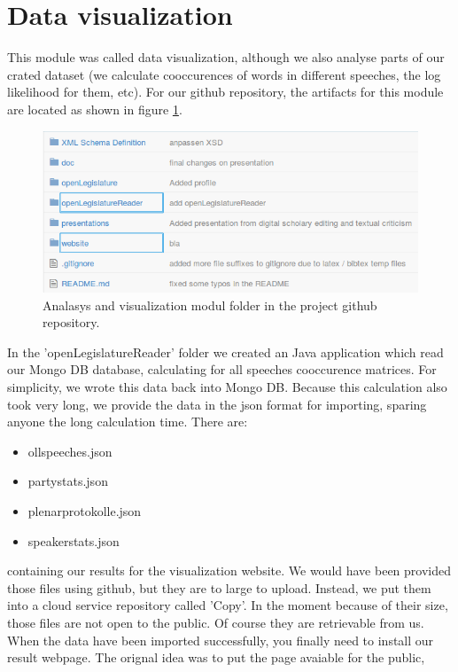 \documentclass[12pt,paper=a4,nenglish]{scrreprt}
\begin{document}
\section{Data visualization}
This module was called data visualization, although we also analyse parts of our
crated dataset (we calculate cooccurences of words in different speeches, the
log likelihood for them, etc). For our github repository, the artifacts for this
module are located as shown in figure \ref{pic:doc_visualization}. 
\begin{figure}[H] 
	\centering
	\includegraphics[scale=0.7]{res/visualization_folder.png}
	\caption{Analasys and visualization modul folder in the project github
	repository.}%
	\label{pic:doc_visualization}%
\end{figure}%
In the 'openLegislatureReader' folder we created an Java application which read
our Mongo DB database, calculating for all speeches cooccurence matrices. For simplicity,
we wrote this data back into Mongo DB. Because this calculation also took very
long, we provide the data in the json format for importing, sparing anyone the
long calculation time. There are: 	
\begin{itemize}
  \item ollspeeches.json
  \item partystats.json
  \item plenarprotokolle.json
  \item speakerstats.json
\end{itemize}
containing our results for the visualization website. We would have been
provided those files using github, but they are to large to upload. Instead, we
put them into a cloud service repository called 'Copy'. In the moment because of
their size, those files are not open to the public. Of course they are
retrievable from us. \\ 
When the data have been imported successfully, you finally need to install our
result webpage. The orignal idea was to put the page avaiable for the public,
\end{document}
